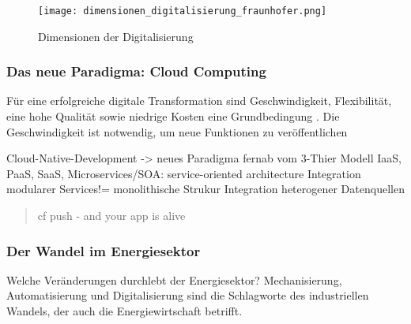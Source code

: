 \begin{figure}[h]
  \texttt{[image: dimensionen\_digitalisierung\_fraunhofer.png]}
  \caption[Dimensionen der Digitalisierung]{Dimensionen der Digitalisierung \citep{FraunhoferISE}}
\end{figure}

\subsubsection{Das neue Paradigma: Cloud Computing}

Für eine erfolgreiche digitale Transformation sind Geschwindigkeit, Flexibilität, eine hohe Qualität
sowie niedrige Kosten eine Grundbedingung \citep{Acharya2019}. Die Geschwindigkeit ist notwendig, um neue Funktionen zu veröffentlichen

Cloud-Native-Development -> neues Paradigma fernab vom 3-Thier Modell
IaaS, PaaS, SaaS, Microservices/SOA: service-oriented architecture
Integration modularer Services!= monolithische Strukur
Integration heterogener Datenquellen

\begin{quotation}
  cf push - and your app is alive
\end{quotation}


\subsubsection{Der Wandel im Energiesektor}
Welche Veränderungen durchlebt der Energiesektor?
Mechanisierung, Automatisierung und Digitalisierung sind die Schlagworte des industriellen Wandels, der auch die Energiewirtschaft betrifft.


